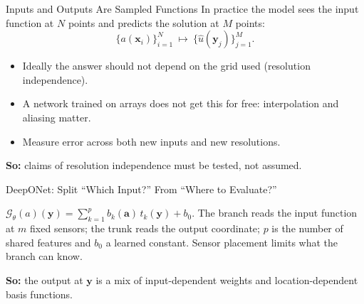 \documentclass{ntuabeamer}
\begin{document}
\begin{frame}{Inputs and Outputs Are Sampled Functions}
  In practice the model sees the input function at \(N\) points and predicts the solution at \(M\) points:
  \[
    \{a(\mathbf x_i)\}_{i=1}^{N}\ \longmapsto\ \{\widehat u(\mathbf y_j)\}_{j=1}^{M}.
  \]
  \begin{itemize}
    \item Ideally the answer should not depend on the grid used (resolution independence).
    \item A network trained on arrays does not get this for free: interpolation and aliasing matter.
    \item Measure error across both new inputs and new resolutions.
  \end{itemize}
  \textbf{So:} claims of resolution independence must be tested, not assumed.
\end{frame}

\begin{frame}{DeepONet: Split ``Which Input?'' From ``Where to Evaluate?''}
  \centering

  \raggedright
  \vspace{0.2cm}
  \small
  \(\mathcal G_\theta(a)(\mathbf y)=\sum_{k=1}^{p}b_k(\mathbf a)\,t_k(\mathbf y)+b_0\). The branch reads the input function at \(m\) fixed sensors; the trunk reads the output coordinate; \(p\) is the number of shared features and \(b_0\) a learned constant.
  Sensor placement limits what the branch can know.

  \textbf{So:} the output at \(\mathbf y\) is a mix of input-dependent weights and location-dependent basis functions.
\end{frame}
\end{document}
